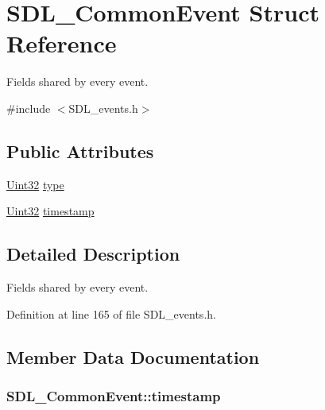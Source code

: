\hypertarget{struct_s_d_l___common_event}{\section{S\-D\-L\-\_\-\-Common\-Event Struct Reference}
\label{struct_s_d_l___common_event}
}


Fields shared by every event.  




{\ttfamily \#include $<$S\-D\-L\-\_\-events.\-h$>$}

\subsection*{Public Attributes}
\begin{DoxyCompactItemize}
\item 
\hyperlink{_s_d_l__stdinc_8h_add440eff171ea5f55cb00c4a9ab8672d}{Uint32} \hyperlink{struct_s_d_l___common_event_a4ecd888325355321b42b2e2956f27453}{type}
\item 
\hyperlink{_s_d_l__stdinc_8h_add440eff171ea5f55cb00c4a9ab8672d}{Uint32} \hyperlink{struct_s_d_l___common_event_a7d9046abb021ffc88dd5d32978289e65}{timestamp}
\end{DoxyCompactItemize}


\subsection{Detailed Description}
Fields shared by every event. 

Definition at line 165 of file S\-D\-L\-\_\-events.\-h.



\subsection{Member Data Documentation}
\hypertarget{struct_s_d_l___common_event_a7d9046abb021ffc88dd5d32978289e65}{
\subsubsection[{timestamp}]{ S\-D\-L\-\_\-\-Common\-Event\-::timestamp}}\label{struct_s_d_l___common_event_a7d9046abb021ffc88dd5d32978289e65}


